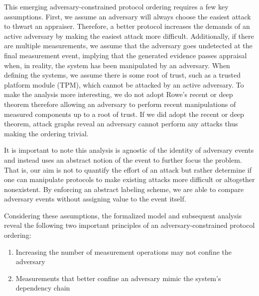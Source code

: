 \documentclass[runningheads]{llncs}
\theoremstyle{definition}
\newcommand{\squash}{\itemsep=0pt\parskip=0pt}
\begin{document}
This emerging adversary-constrained protocol ordering requires a few key assumptions. First, we assume an adversary will always choose the easiest attack to thwart an appraiser. Therefore, a better protocol increases the demands of an active adversary by making the easiest attack more difficult.  Additionally, if there are multiple measurements, we assume that the adversary goes undetected at the final measurement event, implying that the generated evidence passes appraisal when, in reality, the system has been manipulated by an adversary. When defining the systems, we assume there is some root of trust, such as a trusted platform module (TPM), which cannot be attacked by an active adversary. To make the analysis more interesting, we do not adopt Rowe's recent or deep theorem \cite{Rowe:2016:Confining} therefore allowing an adversary to perform recent manipulations of measured components up to a root of trust. If we did adopt the recent or deep theorem, attack graphs reveal an adversary cannot perform any attacks thus making the ordering trivial.

It is important to note this analysis is agnostic of the identity of adversary events and instead uses an abstract notion of the event to further focus the problem. That is, our aim is not to quantify the effort of an attack but rather determine if one can manipulate protocols to make existing attacks more difficult or altogether nonexistent. By enforcing an abstract labeling scheme, we are able to compare adversary events without assigning value to the event itself. 

Considering these assumptions, the formalized model and subsequent analysis reveal the following two important principles of an adversary-constrained protocol ordering:  

\begin{enumerate}
    \item Increasing the number of measurement operations may not confine the adversary 
    \item Measurements that better confine an adversary mimic the system's dependency chain 
\end{enumerate}
\end{document}

